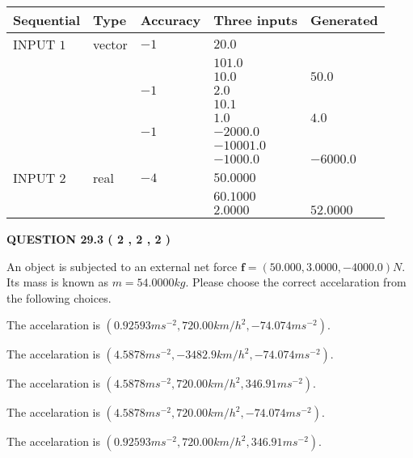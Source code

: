 \documentclass[12pt]{article}
\begin{document}
  
\noindent\begin{tabular}{|l|l|l|l|l|}
\hline
 Sequential & Type & Accuracy & Three inputs & Generated \\ 
\hline
 
 
  INPUT $            1 $ & vector & $           -1  $ & $
20.0
  $ & \\
  & & & $
101.0
  $ & \\
  & & & $
10.0
$ & $ 50.0 $ 
  \\
  & & $           -1  $ & $
2.0
  $ & \\
  & & & $
10.1
  $ & \\
  & & & $
1.0
$ & $ 4.0 $ 
  \\
  & & $           -1  $ & $
-2000.0
  $ & \\
  & & & $
-10001.0
  $ & \\
  & & & $
-1000.0
$ & $ -6000.0 $ 
 \\  \hline  
 
 
  INPUT $            2 $ & real & $           -4  $ & $
 50.0000
  $ & \\
  & & &  $
 60.1000
  $ & \\
  & & &  $
 2.0000
 $ & $ 52.0000 $ 
 \\  \hline  
 \end{tabular}
   
   
  
\vspace{0.2in}
  
{\textbf{\Large{QUESTION
29.3 
 (           2 ,           2 ,           2 )
}}}
  
  
 
An object is subjected to an external net force $\mathbf{f}=(
50.000 ,
3.0000,
-4000.0  )N$. Its mass is known as
$m= %
54.0000  kg$. Please choose the correct accelaration
from the following choices.
 
 
 
The accelaration is
$(
0.92593ms^{-2},
720.00km/h^2,
-74.074ms^{-2}
).
$
 
 
The accelaration is
$(
4.5878ms^{-2},
-3482.9km/h^2,
-74.074ms^{-2}
).
$
 
 
The accelaration is
$(
4.5878ms^{-2},
720.00km/h^2,
346.91ms^{-2}
).
$
 
 
The accelaration is
$(
4.5878ms^{-2},
720.00km/h^2,
-74.074ms^{-2}
).
$
 
 
The accelaration is
$(
0.92593ms^{-2},
720.00km/h^2,
346.91ms^{-2}
).
$
 
\end{document}
